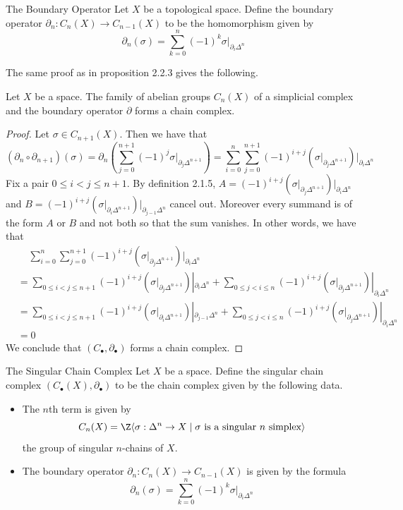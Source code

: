 \documentclass[a4paper]{article}
\begin{document}
\begin{defn}{The Boundary Operator}{} Let $X$ be a topological space. Define the boundary operator $\partial_n:C_n(X)\to C_{n-1}(X)$ to be the homomorphism given by $$\partial_n(\sigma)=\sum_{k=0}^n(-1)^k\sigma|_{\partial_i\Delta^n}$$
\end{defn}

The same proof as in proposition 2.2.3 gives the following. 

\begin{prp}{}{} Let $X$ be a space. The family of abelian groups $C_n(X)$ of a simplicial complex and the boundary operator $\partial$ forms a chain complex. 
\begin{proof}
Let $\sigma\in C_{n+1}(X)$. Then we have that $$(\partial_n\circ\partial_{n+1})(\sigma)=\partial_n\left(\sum_{j=0}^{n+1}(-1)^j\sigma|_{\partial_j\Delta^{n+1}}\right)=\sum_{i=0}^n\sum_{j=0}^{n+1}(-1)^{i+j}\left(\sigma|_{\partial_j\Delta^{n+1}}\right)|_{\partial_i\Delta^n}$$ Fix a pair $0\leq i<j\leq n+1$. By definition 2.1.5, $A=(-1)^{i+j}\left(\sigma|_{\partial_j\Delta^{n+1}}\right)|_{\partial_i\Delta^n}$ and $B=(-1)^{i+j}\left(\sigma|_{\partial_i\Delta^{n+1}}\right)|_{\partial_{j-1}\Delta^n}$ cancel out. Moreover every summand is of the form $A$ or $B$ and not both so that the sum vanishes. In other words, we have that 
\begin{align*}
&\;\;\;\;\sum_{i=0}^n\sum_{j=0}^{n+1}(-1)^{i+j}\left(\sigma|_{\partial_j\Delta^{n+1}}\right)|_{\partial_i\Delta^n}\\
&=\sum_{0\leq i<j\leq n+1}(-1)^{i+j}\left(\sigma|_{\partial_j\Delta^{n+1}}\right)|_{\partial_i\Delta^n}+\sum_{0\leq j<i\leq n}(-1)^{i+j}\left(\sigma|_{\partial_j\Delta^{n+1}}\right)|_{\partial_i\Delta^n}\\
&=\sum_{0\leq i<j\leq n+1}(-1)^{i+j}\left(\sigma|_{\partial_i\Delta^{n+1}}\right)|_{\partial_{j-1}\Delta^n}+\sum_{0\leq j<i\leq n}(-1)^{i+j}\left(\sigma|_{\partial_j\Delta^{n+1}}\right)|_{\partial_i\Delta^n}\\
&=0
\end{align*}
We conclude that $(C_\bullet,\partial_\bullet)$ forms a chain complex. 
\end{proof}
\end{prp}

\begin{defn}{The Singular Chain Complex}{} Let $X$ be a space. Define the singular chain complex $(C_\bullet(X),\partial_\bullet)$ to be the chain complex given by the following data. 
\begin{itemize}
\item The $n$th term is given by $$C_n(X)=\Z\langle\sigma:\Delta^n\to X\;|\;\sigma\text{ is a singular }n\text{ simplex}\rangle$$ the group of singular $n$-chains of $X$. 
\item The boundary operator $\partial_n:C_n(X)\to C_{n-1}(X)$ is given by the formula $$\partial_n(\sigma)=\sum_{k=0}^n(-1)^k\sigma|_{\partial_i\Delta^n}$$
\end{itemize}
\end{defn}
\end{document}
